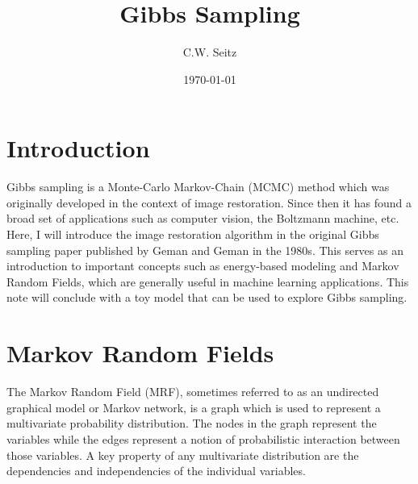 \documentclass{article}
\title{Gibbs Sampling}
\author{C.W. Seitz}
\date{\today}
\begin{document}
\maketitle

\section{Introduction}

Gibbs sampling is a Monte-Carlo Markov-Chain (MCMC) method which was originally developed in the context of image restoration. Since then it has found a broad set of applications such as computer vision, the Boltzmann machine, etc. Here, I will introduce the image restoration algorithm in the original Gibbs sampling paper published by Geman and Geman in the 1980s. This serves as an introduction to important concepts such as energy-based modeling and Markov Random Fields, which are generally useful in machine learning applications. This note will conclude with a toy model that can be used to explore Gibbs sampling.  

\section{Markov Random Fields}

The Markov Random Field (MRF), sometimes referred to as an undirected graphical model or Markov network, is a graph which is used to represent a multivariate probability distribution. The nodes in the graph represent the variables while the edges represent a notion of probabilistic interaction between those variables. A key property of any multivariate distribution are the dependencies and independencies of the individual variables. 
\end{document}
